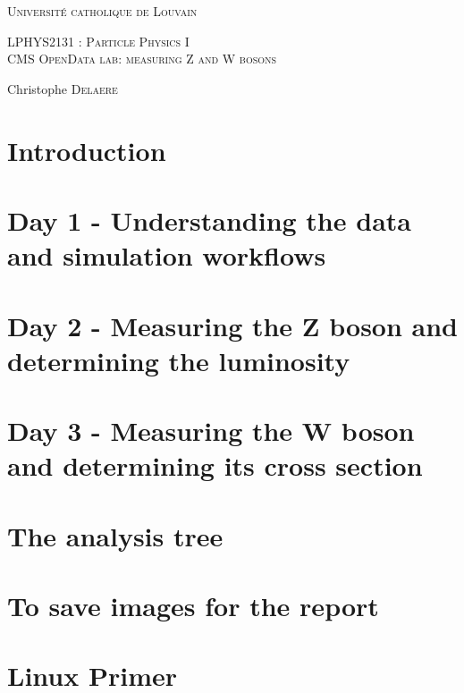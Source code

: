 \documentclass[a4paper]{scrartcl}
\begin{document}
\def\w{\par \vspace{\baselineskip}}
\begin{titlepage}
\begin{center}
\textsc{\Large Université catholique de Louvain }\\[0.5cm]
\w
\w
\textsc{\huge LPHYS2131 : Particle Physics I }\\[0.34cm]
\textsc{\large CMS OpenData lab: measuring Z and W bosons}\\[0.7cm]
\w
\begin{minipage}{0.6\textwidth}
\begin{center}
\large
Christophe \textsc{Delaere}\\
\end{center}
\end{minipage} 
\end{center}
\end{titlepage}

\tableofcontents
\newpage

\section{Introduction}

\newpage

\section{Day 1 - Understanding the data and simulation workflows}

\newpage

\section{Day 2 - Measuring the Z boson and determining the luminosity}

\newpage

\section{Day 3 - Measuring the W boson and determining its cross section}

\newpage

\section{The analysis tree}

\newpage

\section{To save images for the report}

\newpage

\section{Linux Primer}

\newpage
\end{document}
